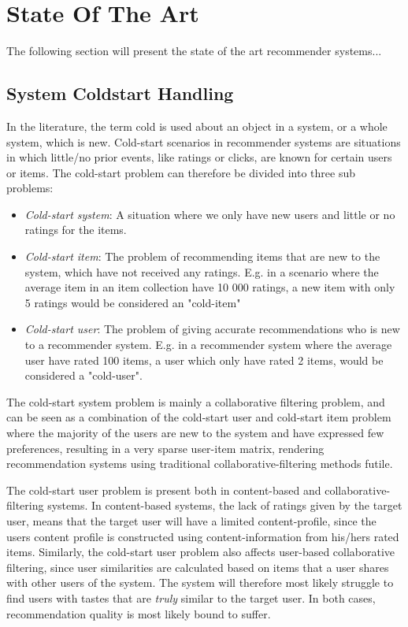 
\section{State Of The Art}

The following section will present the state of the art recommender systems...

\subsection{System Coldstart Handling}


In the literature, the term cold is used about an object in a system, or a whole system, which is new. Cold-start scenarios in recommender systems are situations in which little/no prior events, like ratings or clicks, are known for certain users or items. The cold-start problem can therefore be divided into three sub problems:

\begin{itemize}
	\item \emph{Cold-start system}: A situation where we only have new users and little or no ratings for the items.
	\item \emph{Cold-start item}: The problem of recommending items that are new to the system, which have not received any ratings. E.g. in a scenario where the average item in an item collection have 10 000 ratings, a new item with only 5 ratings would be considered an "cold-item"
	\item \emph{Cold-start user}: The problem of giving accurate recommendations who is new to a recommender system. E.g. in a recommender system where the average user have rated 100 items, a user which only have rated 2 items, would be considered a "cold-user".
\end{itemize}

The cold-start system problem is mainly a collaborative filtering problem, and can be seen as a combination of the cold-start user and cold-start item problem where the majority of the users are new to the system and have expressed few preferences, resulting in a very sparse user-item matrix, rendering recommendation systems using traditional collaborative-filtering methods futile.

The cold-start user problem is present both in content-based and collaborative-filtering systems. In content-based systems, the lack of ratings given by the target user, means that the target user will have a limited content-profile, since the users content profile is constructed using content-information from his/hers rated items. Similarly, the cold-start user problem also affects user-based collaborative filtering, since user similarities are calculated based on items that a user shares with other users of the system. The system will therefore most likely struggle to find users with tastes that are \emph{truly} similar to the target user. In both cases, recommendation quality is most likely bound to suffer.

